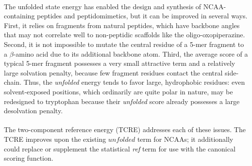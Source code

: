 \paragraph{}
The unfolded state energy has enabled the design and synthesis of NCAA-containing peptides and peptidomimetics\cite{lao_rational_2014,drew_adding_2013}, but it can be improved in several ways.
First, it relies on fragments from natural peptides, which have backbone angles that may not correlate well to non-peptidic scaffolds like the oligo-oxopiperazine.
Second, it is not impossible to mutate the central residue of a 5-mer fragment to a $\beta$-amino acid due to its additional backbone atom.
Third, the average score of a typical 5-mer fragment possesses a very small attractive term and a relatively large solvation penalty, because few fragment residues contact the central side-chain. 
Thus, the \textit{unfolded} energy tends to favor large, hydrophobic residues: even solvent-exposed positions, which ordinarily are quite polar in nature, may be redesigned to tryptophan because their \textit{unfolded} score already possesses a large desolvation penalty.

\paragraph{}
The two-component reference energy (TCRE) addresses each of these issues.
The TCRE improves upon the existing $unfolded$ term for NCAAs; it additionally could replace or supplement the statistical \textit{ref} term for use with the canonical scoring function.



